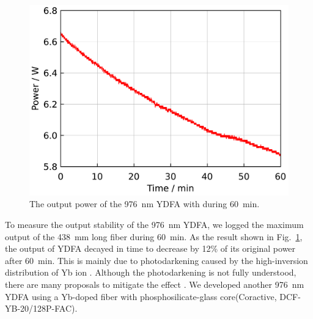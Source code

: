 \documentclass{osa-article}
\begin{document}
\begin{figure}[h!]
  \centering
  \begin{minipage}[b]{0.5\linewidth}
    \centering
    \includegraphics[keepaspectratio, width=0.9\linewidth]{./Figure/Yb1200-20-125DC-PM438mm_LongTermStability_915Pump70W976Seed0.24W_Exp}
  \end{minipage}
  \caption{The output power of the \SI{976}{\nm} YDFA with during \SI{60}{\minute}.}
  \label{fig:LongTermStabilityOfNLIGHT976YDFA}
\end{figure}
To measure the output stability of the \SI{976}{nm} YDFA, we logged the maximum output of the \SI{438}{mm} long fiber during \SI{60}{\minute}.
As the result shown in Fig.~\ref{fig:LongTermStabilityOfNLIGHT976YDFA}, the output of YDFA decayed in time to decrease by 12\% of its original power after \SI{60}{\minute}.
This is mainly due to photodarkening caused by the high-inversion distribution of Yb ion \cite{paschotta1997Lifetime}.
Although the photodarkening is not fully understood, there are many proposals to mitigate the effect \cite{manek-honninger2007Photodarkening, zhao2019Elimination, engholm2008Preventing}.
We developed another \SI{976}{\nm} YDFA using a Yb-doped fiber with phosphosilicate-glass core(Coractive, DCF-YB-20/128P-FAC).
\end{document}
